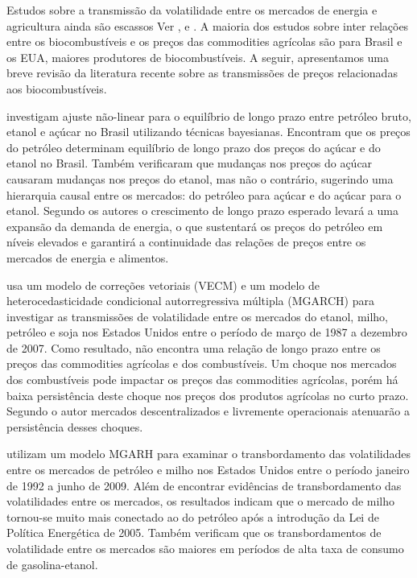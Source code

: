 		
	Estudos sobre a transmissão da  volatilidade entre os mercados de energia e agricultura ainda são escassos Ver ,  e . A maioria dos estudos sobre inter relações entre os biocombustíveis e os preços das commodities agrícolas são para  Brasil e os EUA,  maiores produtores de biocombustíveis. A seguir, apresentamos uma breve revisão  da literatura recente sobre as transmissões de preços relacionadas aos biocombustíveis.   
	
	 investigam  ajuste não-linear para o equilíbrio de longo prazo entre petróleo bruto, etanol e açúcar no Brasil utilizando técnicas bayesianas.  Encontram que os preços do petróleo determinam equilíbrio de longo prazo dos preços do açúcar e do etanol no Brasil. Também verificaram que mudanças nos preços do açúcar causaram mudanças nos preços do etanol, mas não o contrário, sugerindo uma hierarquia causal entre os mercados: do petróleo para açúcar e do açúcar para o etanol. Segundo os autores o crescimento de longo prazo esperado levará a uma expansão da demanda de energia, o que sustentará os preços do petróleo em níveis elevados e garantirá a continuidade das relações de preços entre os mercados de energia e alimentos. 
	
	 usa um modelo de correções vetoriais (VECM) e um modelo de heterocedasticidade  condicional autorregressiva múltipla (MGARCH) para investigar as transmissões de volatilidade entre os mercados do etanol, milho, petróleo e soja nos Estados Unidos entre o período de março de 1987 a dezembro de 2007. Como resultado, não encontra uma relação de longo prazo entre os preços das commodities agrícolas e dos combustíveis. Um choque nos mercados dos combustíveis pode impactar os preços das commodities agrícolas, porém há baixa persistência deste choque nos preços dos produtos agrícolas no curto prazo.  Segundo o autor  mercados descentralizados e livremente operacionais atenuarão a persistência desses choques.
	
	 utilizam um modelo MGARH para examinar o transbordamento das volatilidades entre os mercados de petróleo e milho nos Estados Unidos entre o período janeiro de 1992 a junho de 2009. Além de encontrar evidências de transbordamento das volatilidades entre os mercados, os  resultados indicam que o mercado de milho tornou-se muito mais conectado ao  do petróleo após a introdução da Lei de Política Energética de 2005. Também verificam que os transbordamentos de volatilidade entre os mercados são maiores em períodos de alta taxa de consumo de gasolina-etanol. 
	

